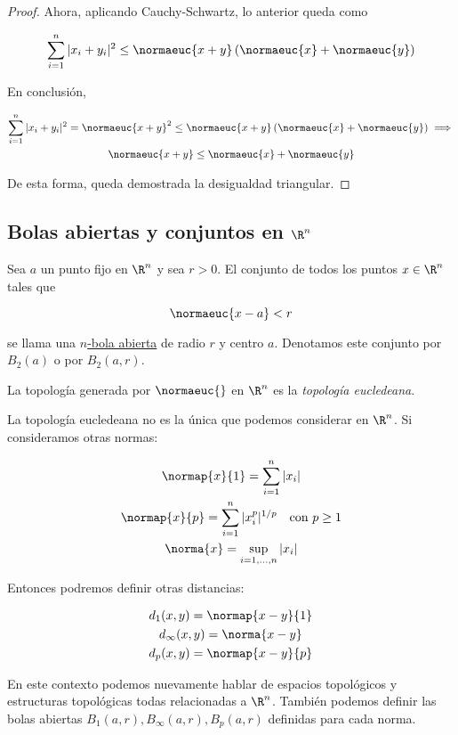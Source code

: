 \begin{proof}
    Ahora, aplicando Cauchy-Schwartz, lo anterior queda como
    
    \[
    \sum_{i=1}^n |x_i + y_i|^2 \leq \normaeuc{x+y} \left( \normaeuc{x} + \normaeuc{y} \right)
    \]
    
    En conclusión,
    
    \begin{gather*}
        \sum_{i=1}^n |x_i + y_i|^2 = \normaeuc{x + y}^2 \leq \normaeuc{x+y} \left( \normaeuc{x} + \normaeuc{y} \right) \implies \\
        \normaeuc{x + y} \leq \normaeuc{x} + \normaeuc{y}
    \end{gather*}
    
    De esta forma, queda demostrada la desigualdad triangular.
\end{proof}

\subsection{Bolas abiertas y conjuntos en $\R^n$}

\begin{defn}
    Sea $a$ un punto fijo en $\R^n$ y sea $r>0$. El conjunto de todos los puntos $x \in \R^n$ tales que

    \[
    \normaeuc{x-a} < r
    \]
    
    \noindent se llama una \ul{$n$-bola abierta} de radio $r$ y centro $a$. Denotamos este conjunto por $B_2(a)$ o por $B_2(a, r)$.
\end{defn}

La topología generada por $\normaeuc{ }$ en $\R^n$ es la \textit{topología eucledeana}.

\begin{aco}
    La topología eucledeana no es la única que podemos considerar en $\R^n$. Si consideramos otras normas:
    
    \begin{gather*}
        \normap{x}{1} = \sum_{i=1}^n |x_i| \\
        \normap{x}{p} = \sum_{i=1}^n |x_i^p|^{1/p} \quad \text{con $p \geq 1$} \\
        \norma{x} = \sup_{i = 1, \dots, n} |x_i|
    \end{gather*}
    
    Entonces podremos definir otras distancias:
    
    \begin{gather*}
        d_1(x,y) = \normap{x-y}{1} \\
        d_{\infty}(x,y) = \norma{x-y} \\
        d_p(x,y) = \normap{x-y}{p}
    \end{gather*}
    
    En este contexto podemos nuevamente hablar de espacios topológicos y estructuras topológicas todas relacionadas a $\R^n$. También podemos definir las bolas abiertas $B_1(a,r), B_{\infty}(a,r), B_p(a,r)$ definidas para cada norma.
\end{aco}

